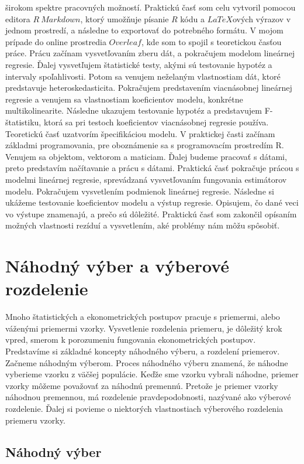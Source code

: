 \documentclass[]{tukediphc}
\begin{document}
širokom spektre pracovných možností. Praktickú časť som celu vytvoril pomocou editora $R \ Markdown$, ktorý umožňuje písanie $R$ kódu a $LaTeX$ových výrazov v jednom prostredí, a následne to exportovať do potrebného formátu. V mojom prípade do online prostredia $Overleaf$, kde som to spojil s teoretickou časťou práce. Prácu začínam vysvetľovaním zberu dát, a pokračujem modelom lineárnej regresie. Ďalej vysvetľujem štatistické testy, akými sú testovanie hypotéz a intervaly spoľahlivosti. Potom sa venujem neželaným vlastnostiam dát, ktoré predstavuje heteroskedasticita. Pokračujem predstavením viacnásobnej lineárnej regresie a venujem sa vlastnostiam koeficientov modelu, konkrétne multikolinearite. Následne ukazujem testovanie hypotéz a predstavujem F-štatistiku, ktorá sa pri testoch koeficientov viacnásobnej regresie používa. Teoretickú časť uzatvorím špecifikáciou modelu. V praktickej časti začínam základmi programovania, pre oboznámenie sa s programovacím prostredím R. Venujem sa objektom, vektorom a maticiam. Ďalej budeme pracovať s dátami, preto predstavím načítavanie a prácu s dátami. Praktická časť pokračuje prácou s modelmi lineárnej regresie, sprevádzaná vysvetľovaním fungovania estimátorov modelu. Pokračujem vysvetlením podmienok lineárnej regresie. Následne si ukážeme testovanie koeficientov modelu a výstup regresie. Opisujem, čo dané veci vo výstupe znamenajú, a prečo sú dôležité. Praktickú časť som zakončil opísaním možných vlastnosti rezíduí a vysvetlením, aké problémy nám môžu spôsobiť.

\section{Náhodný výber a výberové rozdelenie}

Mnoho štatistických a ekonometrických postupov pracuje s priemermi, alebo váženými priemermi vzorky. Vysvetlenie rozdelenia priemeru, je dôležitý krok vpred, smerom k porozumeniu fungovania ekonometrických postupov. Predstavíme si základné koncepty náhodného výberu, a rozdelení priemerov. Začneme náhodným výberom. Proces náhodného výberu znamená, že náhodne vyberieme vzorku z väčšej populácie. Keďže sme vzorku vybrali náhodne, priemer vzorky môžeme považovať za náhodnú premennú. Pretože je priemer vzorky náhodnou premennou, má rozdelenie pravdepodobnosti, nazývané ako výberové rozdelenie. Ďalej si povieme o niektorých vlastnostiach výberového rozdelenia priemeru vzorky. 

\subsection{Náhodný výber}
\end{document}
